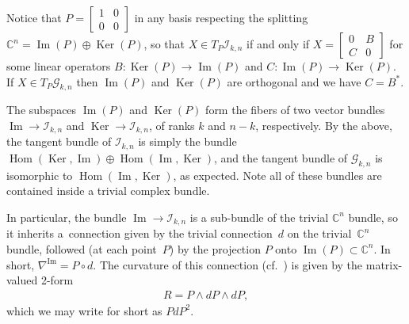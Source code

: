 \documentclass[pdftex]{sigma}
\numberwithin{equation}{section}
\newcommand{\CC}{\mathbb{C}}
\newcommand{\cG}{{\mathcal G}}
\newcommand{\cI}{{\mathcal I}}
\begin{document}
Notice that $P =\left[\begin{smallmatrix}
1 & 0 \\
0 & 0
\end{smallmatrix}\right]$ in any basis respecting the splitting $\CC^n = \operatorname{Im}(P) \oplus \operatorname{Ker}(P)$, so that $X \in T_P \cI_{k,n}$ if and only if
$X =\left[\begin{smallmatrix}
0 & B \\
C & 0
\end{smallmatrix}\right]$ for some linear operators $B\colon \operatorname{Ker}(P) \to \operatorname{Im}(P)$ and $C \colon \operatorname{Im}(P) \to \operatorname{Ker}(P)$. If $X \in T_P \cG_{k,n}$ then $\operatorname{Im}(P)$ and $\operatorname{Ker}(P)$ are orthogonal and we have $C = B^*$.

The subspaces $\operatorname{Im}(P)$ and $\operatorname{Ker}(P)$ form the fibers of two vector bundles $\operatorname{Im} \to \cI_{k,n}$ and
$\operatorname{Ker} \to \cI_{k,n}$, of ranks $k$ and $n-k$, respectively. By the above, the tangent bundle of $\cI_{k,n}$ is simply the bundle $\operatorname{Hom}( \operatorname{Ker}, \operatorname{Im}) \oplus \operatorname{Hom}( \operatorname{Im}, \operatorname{Ker})$, and the tangent bundle of $\cG_{k,n}$ is isomorphic to $\operatorname{Hom}(\operatorname{Im},\operatorname{Ker})$, as expected. Note all of these bundles are contained inside a trivial complex bundle.

In particular, the bundle $\operatorname{Im} \to \cI_{k,n}$ is a sub-bundle of the trivial $\CC^n$ bundle, so it inherits a~connection given by
the trivial connection~$d$ on the trivial~$\CC^n$ bundle, followed (at each point~$P$) by the projection $P$ onto $\operatorname{Im}(P) \subset \CC^n$. In short, $\nabla^{\operatorname{Im}} = P \circ d$. The curvature of this connection (cf.~\cite[p.~344]{K}) is given by the matrix-valued 2-form
\begin{gather*}
R = P \wedge dP \wedge dP,
\end{gather*}
which we may write for short as $PdP^2$.
\end{document}
